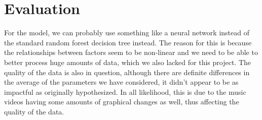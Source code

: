 \section{Evaluation}
\label{sec:eval}
For the model, we can probably use something like a neural network instead of the standard random forest decision tree instead. The reason for this is because the relationships between factors seem to be non-linear and we need to be able to better process huge amounts of data, which we also lacked for this project.
The quality of the data is also in question, although there are definite differences in the average of the parameters we have considered, it didn’t appear to be as impactful as originally hypothesized. In all likelihood, this is due to the music videos having some amounts of graphical changes as well, thus affecting the quality of the data.

